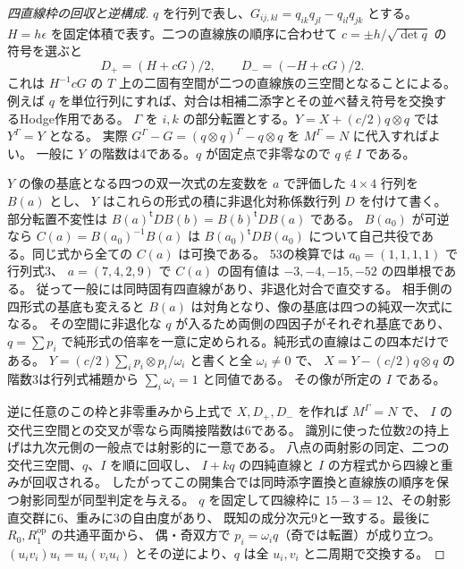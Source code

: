 \begin{proof}[四直線枠の回収と逆構成]
$q$ を行列で表し、$G_{ij,kl}=q_{ik}q_{jl}-q_{il}q_{jk}$ とする。
$H=h\epsilon$ を固定体積で表す。二つの直線族の順序に合わせて
$c=\pm h/\sqrt{\det q}$ の符号を選ぶと
\[
 D_+=(H+cG)/2,\qquad D_-=(-H+cG)/2 .
\]
これは $H^{-1}cG$ の $T$ 上の二固有空間が二つの直線族の三空間となることによる。
例えば $q$ を単位行列にすれば、対合は相補二添字とその並べ替え符号を交換するHodge作用である。
$\Gamma$ を $i,k$ の部分転置とする。$Y=X+(c/2)q\otimes q$ では $Y^\Gamma=Y$ となる。
実際 $G^\Gamma-G=(q\otimes q)^\Gamma-q\otimes q$ を $M^\Gamma=N$ に代入すればよい。
一般に $Y$ の階数は4である。$q$ が固定点で非零なので $q\notin I$ である。

$Y$ の像の基底となる四つの双一次式の左変数を $a$ で評価した $4\times4$ 行列を $B(a)$ とし、
$Y$ はこれらの形式の積に非退化対称係数行列 $D$ を付けて書く。
部分転置不変性は $B(a)^{\mathsf t}D B(b)=B(b)^{\mathsf t}D B(a)$ である。
$B(a_0)$ が可逆なら $C(a)=B(a_0)^{-1}B(a)$ は
$B(a_0)^{\mathsf t}D B(a_0)$ について自己共役である。同じ式から全ての $C(a)$ は可換である。
53の検算では $a_0=(1,1,1,1)$ で行列式3、
$a=(7,4,2,9)$ で $C(a)$ の固有値は $-3,-4,-15,-52$ の四単根である。
従って一般には同時固有四直線があり、非退化対合で直交する。
相手側の四形式の基底も変えると $B(a)$ は対角となり、像の基底は四つの純双一次式になる。
その空間に非退化な $q$ が入るため両側の四因子がそれぞれ基底であり、
$q=\sum p_i$ で純形式の倍率を一意に定められる。純形式の直線はこの四本だけである。
$Y=(c/2)\sum_i p_i\otimes p_i/\omega_i$ と書くと全 $\omega_i\ne0$ で、
$X=Y-(c/2)q\otimes q$ の階数3は行列式補題から $\sum_i\omega_i=1$ と同値である。
その像が所定の $I$ である。

逆に任意のこの枠と非零重みから上式で $X,D_+,D_-$ を作れば $M^\Gamma=N$ で、
$I$ の交代三空間との交叉が零なら両隣接階数は6である。
識別に使った位数2の持上げは九次元側の一般点では射影的に一意である。
八点の両射影の同定、二つの交代三空間、$q$、$I$ を順に回収し、
$I+kq$ の四純直線と $I$ の方程式から四線と重みが回収される。
したがってこの開集合では同時添字置換と直線族の順序を保つ射影同型が同型判定を与える。
$q$ を固定して四線枠に $15-3=12$、その射影直交群に6、重みに3の自由度があり、
既知の成分次元9と一致する。最後に $R_0,R_1^{\mathrm{op}}$ の共通平面から、
偶・奇双方で $p_i=\omega_i q$（奇では転置）が成り立つ。
$(u_i v_i)u_i=u_i(v_i u_i)$ とその逆により、$q$ は全 $u_i,v_i$ と二周期で交換する。
\end{proof}
